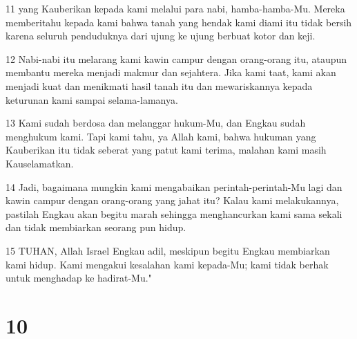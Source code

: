 \par 11 yang Kauberikan kepada kami melalui para nabi, hamba-hamba-Mu. Mereka memberitahu kepada kami bahwa tanah yang hendak kami diami itu tidak bersih karena seluruh penduduknya dari ujung ke ujung berbuat kotor dan keji.
\par 12 Nabi-nabi itu melarang kami kawin campur dengan orang-orang itu, ataupun membantu mereka menjadi makmur dan sejahtera. Jika kami taat, kami akan menjadi kuat dan menikmati hasil tanah itu dan mewariskannya kepada keturunan kami sampai selama-lamanya.
\par 13 Kami sudah berdosa dan melanggar hukum-Mu, dan Engkau sudah menghukum kami. Tapi kami tahu, ya Allah kami, bahwa hukuman yang Kauberikan itu tidak seberat yang patut kami terima, malahan kami masih Kauselamatkan.
\par 14 Jadi, bagaimana mungkin kami mengabaikan perintah-perintah-Mu lagi dan kawin campur dengan orang-orang yang jahat itu? Kalau kami melakukannya, pastilah Engkau akan begitu marah sehingga menghancurkan kami sama sekali dan tidak membiarkan seorang pun hidup.
\par 15 TUHAN, Allah Israel Engkau adil, meskipun begitu Engkau membiarkan kami hidup. Kami mengakui kesalahan kami kepada-Mu; kami tidak berhak untuk menghadap ke hadirat-Mu."

\chapter{10}

